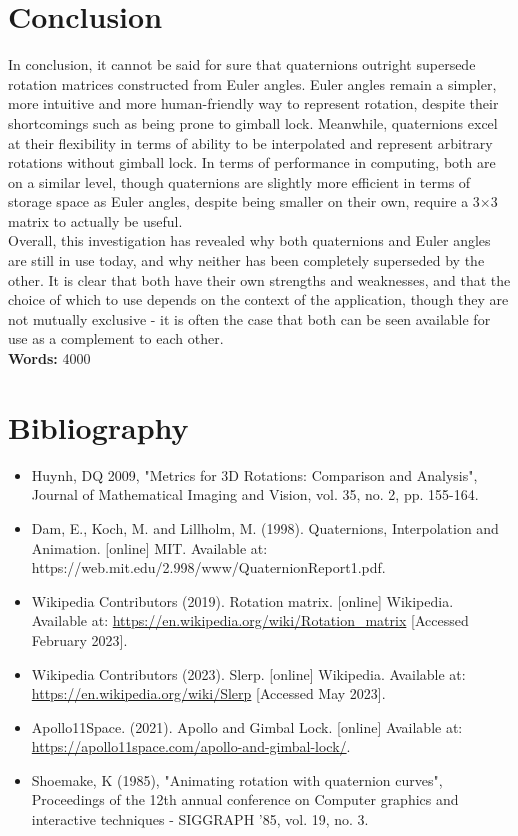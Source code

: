 \documentclass[12pt, a4paper]{article}
\begin{document}
\section{Conclusion}
In conclusion, it cannot be said for sure that quaternions outright supersede
rotation matrices constructed from Euler angles. Euler angles remain a simpler,
more intuitive and more human-friendly way to represent rotation, despite their
shortcomings such as being prone to gimball lock. Meanwhile, quaternions excel
at their flexibility in terms of ability to be interpolated and represent
arbitrary rotations without gimball lock. In terms of performance in computing,
both are on a similar level, though quaternions are slightly more efficient in
terms of storage space as Euler angles, despite being smaller on their own,
require a 3$\times$3 matrix to actually be useful. \\

Overall, this investigation has revealed why both quaternions and Euler angles
are still in use today, and why neither has been completely superseded by the
other. It is clear that both have their own strengths and weaknesses, and that
the choice of which to use depends on the context of the application, though
they are not mutually exclusive - it is often the case that both can be seen
available for use as a complement to each other. \\

\textbf{Words: } 4000

\pagebreak
\section{Bibliography}
\begin{itemize}[rightmargin=2cm]
    \item Huynh, DQ 2009, "Metrics for 3D Rotations: Comparison and Analysis", Journal of Mathematical Imaging and Vision, vol. 35, no. 2, pp. 155-164.
    \item Dam, E., Koch, M. and Lillholm, M. (1998). Quaternions, Interpolation
    and Animation. [online] MIT. Available at:
    https://web.mit.edu/2.998/www/QuaternionReport1.pdf.
    \item Wikipedia Contributors (2019). Rotation matrix. [online] Wikipedia. Available at: \url{https://en.wikipedia.org/wiki/Rotation_matrix} [Accessed February 2023].
    \item Wikipedia Contributors (2023). Slerp. [online] Wikipedia. Available at: \url{https://en.wikipedia.org/wiki/Slerp} [Accessed May 2023].
    \item Apollo11Space. (2021). Apollo and Gimbal Lock. [online] Available at: \url{https://apollo11space.com/apollo-and-gimbal-lock/}.
    \item Shoemake, K (1985), "Animating rotation with quaternion curves", Proceedings of the 12th annual conference on Computer graphics and interactive techniques  - SIGGRAPH ’85, vol. 19, no. 3.
\end{itemize}
\end{document}
